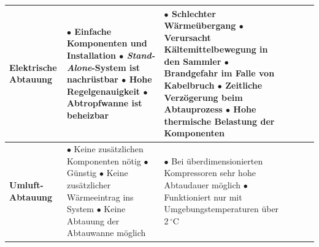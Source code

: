 \begin{table}[htb]
\begin{tabular}{p{3.8cm}p{5.6cm}p{5.6cm}lll}
\hline
\textbf{Elektrische Abtauung }
&$\bullet$ Einfache Komponenten und Installation 
\newline 
$\bullet$ \textit{Stand-Alone}-System ist nachrüstbar		
\newline
$\bullet$ Hohe Regelgenauigkeit	
\newline
$\bullet$ Abtropfwanne ist beheizbar 					
&
$\bullet$ Schlechter Wärmeübergang 
\newline					
$\bullet$ Verursacht Kältemittelbewegung in den Sammler
\newline 
$\bullet$ Brandgefahr im Falle von Kabelbruch  
\newline
$\bullet$ Zeitliche Verzögerung beim Abtauprozess 
\newline
$\bullet$ Hohe thermische Belastung der Komponenten    
\\

 
\hline
\textbf{Umluft-Abtauung }
&
$\bullet$	Keine zusätzlichen Komponenten nötig			 
\newline
$\bullet$	Günstig										
\newline
$\bullet$	Keine zusätzlicher Wärmeeintrag ins System	  
\newline
$\bullet$	Keine Abtauung der Abtauwanne möglich	
&
$\bullet$ Bei überdimensionierten Kompressoren sehr hohe Abtaudauer möglich
\newline
$\bullet$ Funktioniert nur mit Umgebungstemperaturen über $ 2\,^{\circ}\mathrm{C} $
\\
\hline

\end{tabular}
\label{tab:Vor- und Nachteile}
\end{table}
